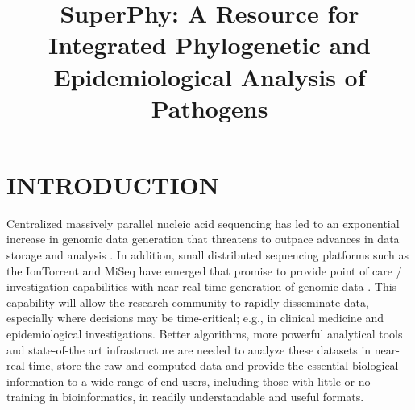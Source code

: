 \documentclass[a4paper,twoside]{article}
\begin{document}
\title{SuperPhy: A Resource for Integrated Phylogenetic and Epidemiological Analysis of Pathogens}

\author{
}



\onecolumn \maketitle \normalsize \vfill

\section{\uppercase{Introduction}}
\label{sec:introduction}

\noindent Centralized massively parallel nucleic acid sequencing has led to an exponential increase in genomic data generation that threatens to outpace advances in data storage and analysis \cite{kahn_future_2011,teeling_current_2012}. In addition, small distributed sequencing platforms such as the IonTorrent and MiSeq have emerged that promise to provide point of care / investigation capabilities with near-real time generation of genomic data \cite{loman_performance_2012}. This capability will allow the research community to rapidly disseminate data, especially where decisions may be time-critical; e.g., in clinical medicine and epidemiological investigations. Better algorithms, more powerful analytical tools and state-of-the art infrastructure are needed to analyze these datasets in near-real time, store the raw and computed data and provide the essential biological information to a wide range of end-users, including those with little or no training in bioinformatics, in readily understandable and useful formats.
\end{document}
